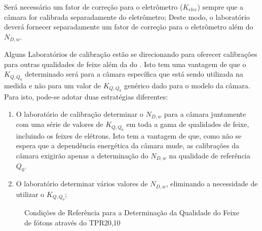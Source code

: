 \documentclass[11pt,a4paper]{article}
\newcounter{exemplo}
\begin{document}
	\begin{exemplo}
		Será necessário um fator de correção para o eletrômetro ($K_{elec}$) sempre que a câmara for calibrada separadamente do eletrômetro; Deste modo, o laboratório deverá fornecer separadamente um fator de correção para o eletrômetro além do $N_{D,w}$. 
	\end{exemplo}


	Alguns Laboratórios de calibração estão se direcionando para oferecer calibrações para outras qualidades de feixe além da do . Isto tem uma vantagem de que o $K_{Q,Q_0}$ determinado será para a câmara específica que está sendo utilizada na medida e não para um valor de $K_{Q,Q_0}$ genérico dado para o modelo da câmara. Para isto, pode-se adotar duas estratégias diferentes:

	\begin{enumerate}
		\item O laboratório de calibração determinar o $N_{D,w}$ para a câmara juntamente com uma série de valores de $K_{Q,Q_0}$ em toda a gama de qualidades de feixe, incluindo os feixes de elétrons. Isto tem a vantagem de que, como não se espera que a dependência energética da câmara mude, as calibrações da câmara exigirão apenas a determinação do $N_{D,w}$ na qualidade de referência $Q_0$.
		\item O laboratório determinar vários valores de $N_{D,w}$, eliminando a necessidade de utilizar o $K_{Q,Q_0}$;
	\end{enumerate}

	\begin{figure}[h]
		\centering
		\caption{Condições de Referência para a Determinação da Qualidade do Feixe de fótons através do TPR20,10}
		\label{fig:condicoesReferenciasTPR2010jpg}
	\end{figure}
\end{document}
